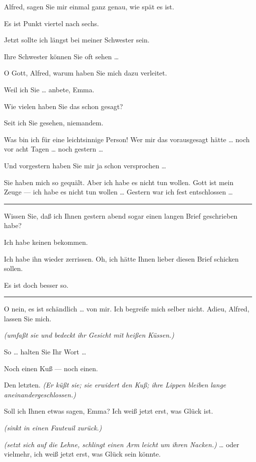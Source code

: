 \documentclass[
	final,
	a4paper,
	ngerman,
	mpinclude = true, %
	twoside = true,
	open = right,
	cleardoublepage = plain,
	DIV = 13,
	BCOR = 1cm,
	titlepage = firstiscover,
	]{scrbook}
\newcommand{\direction}[1]{\textit{(#1)}}
\newenvironment{deletion}{%
		\vspace{0.25\baselineskip}
		\hrule
		\vspace{0.25\baselineskip}
		\color{darkgray}
	}{
		\color{black}
		\vspace{0.25\baselineskip}
		\hrule 
		\vspace{0.25\baselineskip}
	}
\newcommand{\thecharacter}[1]{\textup{\textsc{#1}}\xspace}
\newcommand{\theherr}{\thecharacter{Junger Herr}}
\newcommand{\thefrau}{\thecharacter{Junge Frau}}
\newcommand{\character}[1]{\item[#1:]}
\newcommand{\herr}{\character{\theherr}}
\newcommand{\frau}{\character{\thefrau}}
\begin{document}
\begin{play}
	\frau
	Alfred, sagen Sie mir einmal ganz genau, wie spät es ist.

	\herr
	Es ist Punkt viertel nach sechs.

	\frau
	Jetzt sollte ich längst bei meiner Schwester sein.

	\herr
	Ihre Schwester können Sie oft sehen \ldots{}

	\frau
	O Gott, Alfred, warum haben Sie mich dazu verleitet.

	\herr
	Weil ich Sie \ldots{} anbete, Emma.

	\frau
	Wie vielen haben Sie das schon gesagt?

	\herr
	Seit ich Sie gesehen, niemandem.

	\frau
	Was bin ich für eine leichtsinnige Person! Wer mir das vorausgesagt hätte \ldots{} noch vor acht Tagen \ldots{} noch gestern \ldots{}

	\herr
	Und vorgestern haben Sie mir ja schon versprochen \ldots{}

	\frau
	Sie haben mich so gequält. Aber ich habe es nicht tun wollen. Gott ist mein Zeuge --- ich habe es nicht tun wollen \ldots{} Gestern war ich fest entschlossen \ldots{}

	\begin{deletion}
	Wissen Sie, daß ich Ihnen gestern abend sogar einen langen Brief geschrieben habe?

	\herr
	Ich habe keinen bekommen.

	\frau
	Ich habe ihn wieder zerrissen. Oh, ich hätte Ihnen lieber diesen Brief schicken sollen.

	\herr
	Es ist doch besser so.
	\end{deletion}

	\frau
	O nein, es ist schändlich \ldots{} von mir. Ich begreife mich selber nicht. Adieu, Alfred, lassen Sie mich.

	\herr
	\direction{umfaßt sie und bedeckt ihr Gesicht mit heißen Küssen.}

	\frau
	So \ldots{} halten Sie Ihr Wort \ldots{}

	\herr
	Noch einen Kuß --- noch einen.

	\frau
	Den letzten. \direction{Er küßt sie; sie erwidert den Kuß; ihre Lippen bleiben lange aneinandergeschlossen.}

	\herr
	Soll ich Ihnen etwas sagen, Emma? Ich weiß jetzt erst, was Glück ist.

	\frau
	\direction{sinkt in einen Fauteuil zurück.}

	\herr
	\direction{setzt sich auf die Lehne, schlingt einen Arm leicht um ihren Nacken.} \ldots{} oder vielmehr, ich weiß jetzt erst, was Glück sein könnte.


\end{play}
\end{document}
